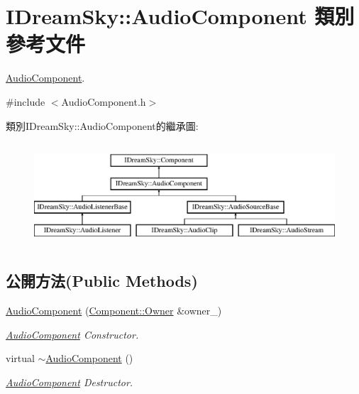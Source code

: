 \hypertarget{class_i_dream_sky_1_1_audio_component}{}\section{I\+Dream\+Sky\+:\+:Audio\+Component 類別 參考文件}
\label{class_i_dream_sky_1_1_audio_component}


\hyperlink{class_i_dream_sky_1_1_audio_component}{Audio\+Component}.  




{\ttfamily \#include $<$Audio\+Component.\+h$>$}

類別\+I\+Dream\+Sky\+:\+:Audio\+Component的繼承圖\+:\begin{figure}[H]
\begin{center}
\leavevmode
\includegraphics[height=3.868739cm]{class_i_dream_sky_1_1_audio_component}
\end{center}
\end{figure}
\subsection*{公開方法(Public Methods)}
\begin{DoxyCompactItemize}
\item 
\hyperlink{class_i_dream_sky_1_1_audio_component_a45436b6739b5a0d6bedd8cbb9318a3c6}{Audio\+Component} (\hyperlink{class_i_dream_sky_1_1_component_1_1_owner}{Component\+::\+Owner} \&owner\+\_\+)
\begin{DoxyCompactList}\small\item\em \hyperlink{class_i_dream_sky_1_1_audio_component}{Audio\+Component} Constructor. \end{DoxyCompactList}\item 
virtual \hyperlink{class_i_dream_sky_1_1_audio_component_a68bf2351458d61601aad7abeb3f58588}{$\sim$\+Audio\+Component} ()
\begin{DoxyCompactList}\small\item\em \hyperlink{class_i_dream_sky_1_1_audio_component}{Audio\+Component} Destructor. \end{DoxyCompactList}\end{DoxyCompactItemize}
